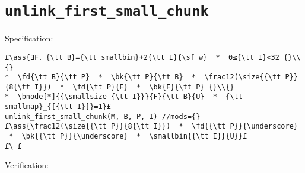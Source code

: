 \documentclass[10pt,twoside]{report}
\makeatletter
\newcommand{\ml}[2][t]{\mbox{\mdseries\begin{tabular}[#1]{@{}L@{}}#2\end{tabular}}}
\newcommand{\ass}[1]{\ensuremath{{\color{blue}\left\{\ml[c]{#1}\right\}}}}
\makeatother
\begin{document}
\section{{\tt unlink\_first\_small\_chunk}}

Specification:
\begin{lstlisting}
£\ass{∃F．{\tt B}={\tt smallbin}+2{\tt I}{\sf w}  *  0≤{\tt I}<32 {}\\{}
*  \fd{\tt B}{\tt P}  *  \bk{\tt P}{\tt B}  *  \frac12(\size{{\tt P}}{8{\tt I}})  *  \fd{\tt P}{F}  *  \bk{F}{\tt P} {}\\{}
*  \bnode[*]{{\smallsize {\tt I}}}{F}{\tt B}{U}  *  {\tt smallmap}_{[{\tt I}]}=1}£
unlink_first_small_chunk(M, B, P, I) //mods={}
£\ass{\frac12(\size{{\tt P}}{8{\tt I}})  *  \fd{{\tt P}}{\underscore}  *  \bk{{\tt P}}{\underscore}  *  \smallbin{{\tt I}}{U}}£
£\ £
\end{lstlisting}

\noindent Verification:

\setlength\rC{8mm}   %
\setlength\rA{15mm}  %
\setlength\rB{40mm}  %
\setlength\rD{20mm}  %
\setlength\rE{18mm}  %
\setlength\rF{25mm}  %
\setlength\rG{17mm}  %
\setlength\rH{18mm}  %
\setlength\rI{37mm}  %
\setlength\rJ{42mm}  %

\setlength\rK{\rA}   %
  \addtolength\rK{-\rC}\addtolength\rK{-1mm}
\setlength\rO{2mm}   %
  \addtolength\rO{\rC}\addtolength\rO{\rG}
  \addtolength\rO{\rH}\addtolength\rO{\rI} 
\setlength\rP{2mm}   %
  \addtolength\rP{\rA}\addtolength\rP{\rG}
  \addtolength\rP{\rH}\addtolength\rP{\rI}
  \addtolength\rP{\rJ}\addtolength\rP{\rD}
\setlength\rL{\rH}   %
  \addtolength\rL{\rI}\addtolength\rL{\rD}
\setlength\rM{1mm}   %
  \addtolength\rM{\rL}\addtolength\rM{\rJ}\addtolength\rM{\rB}
\setlength\rN{\rJ}   %
  \addtolength\rN{\rD}
\end{document}
